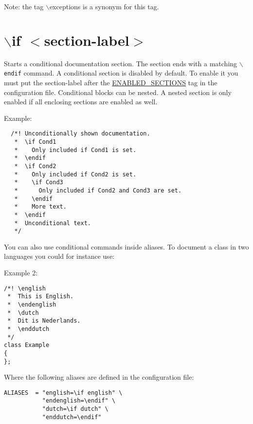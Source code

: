 \begin{Desc}
\item[Note: ]the tag $\backslash$exceptions is a synonym for this tag.\end{Desc}


 \hypertarget{commands_cmdif}{}\section{$\backslash$if $<$section-label$>$}\label{commands_cmdif}
 Starts a conditional documentation section. The section ends with a matching {\tt $\backslash$endif} command. A conditional section is disabled by default. To enable it you must put the section-label after the \hyperlink{config_cfg_enabled_sections}{ENABLED\_\-SECTIONS} tag in the configuration file. Conditional blocks can be nested. A nested section is only enabled if all enclosing sections are enabled as well.

\begin{Desc}
\item[Example:]

\footnotesize\begin{verbatim}
  /*! Unconditionally shown documentation.
   *  \if Cond1
   *    Only included if Cond1 is set.
   *  \endif
   *  \if Cond2
   *    Only included if Cond2 is set.
   *    \if Cond3
   *      Only included if Cond2 and Cond3 are set.
   *    \endif
   *    More text.
   *  \endif
   *  Unconditional text.
   */
\end{verbatim}
\normalsize
\end{Desc}
You can also use conditional commands inside aliases. To document a class in two languages you could for instance use:

\begin{Desc}
\item[Example 2:]

\footnotesize\begin{verbatim}
/*! \english
 *  This is English.
 *  \endenglish
 *  \dutch
 *  Dit is Nederlands.
 *  \enddutch
 */
class Example
{
};
\end{verbatim}
\normalsize
 \end{Desc}
Where the following aliases are defined in the configuration file:



\footnotesize\begin{verbatim}
ALIASES  = "english=\if english" \
           "endenglish=\endif" \
           "dutch=\if dutch" \
           "enddutch=\endif"
\end{verbatim}
\normalsize


